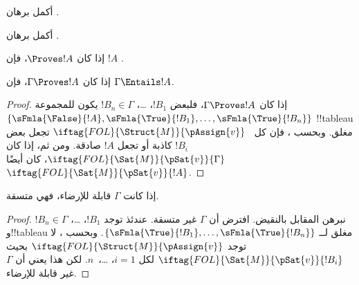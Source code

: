\documentclass[../../../include/open-logic-section]{subfiles}
\begin{document}
\begin{prob}
أكمل برهان .
\end{prob}
\tagendprob

\begin{prob}
أكمل برهان .
\end{prob}
\tagendprob

\begin{cor}
إذا كان $\Proves !A$، فإن $!A$ .
\end{cor}

\begin{cor}
إذا كان $\Gamma \Proves !A$، فإن $\Gamma \Entails !A$.
\end{cor}

\begin{proof}
  إذا كان $\Gamma \Proves !A$، فلبعض $!B_1$، \dots، $!B_n \in
  \Gamma$ يكون للمجموعة $\{\sFmla{\False}{!A}, \sFmla{\True}{!B_1}, \dots,
  \sFmla{\True}{!B_n}\}$ !!{tableau} مغلق. وبحسب
  ، فإن كل
  ~$\iftag{FOL}{\Struct{M}}{\pAssign{v}}$
  تجعل بعض $!B_i$ كاذبة أو تجعل $!A$ صادقة. ومن ثم، إذا كان
  $\iftag{FOL}{\Sat{M}}{\pSat{v}}{\Gamma}$، كان أيضًا
  $\iftag{FOL}{\Sat{M}}{\pSat{v}}{!A}$.
\end{proof}

\begin{cor}
إذا كانت $\Gamma$ قابلة للإرضاء، فهي متسقة.
\end{cor}

\begin{proof}
نبرهن المقابل بالنقيض. افترض أن $\Gamma$ غير متسقة. عندئذ توجد $!B_1$،
\dots، $!B_n \in \Gamma$ و!!{tableau} مغلق لــ
$\{\sFmla{\True}{!B_1}, \dots, \sFmla{\True}{!B_n}\}$. وبحسب
، لا توجد
$\iftag{FOL}{\Struct{M}}{\pAssign{v}}$ بحيث
$\iftag{FOL}{\Sat{M}}{\pSat{v}}{!B_i}$ لكل $i=1$، \dots،~$n$.
لكن هذا يعني أن $\Gamma$ غير قابلة للإرضاء.
\end{proof}
\end{document}
